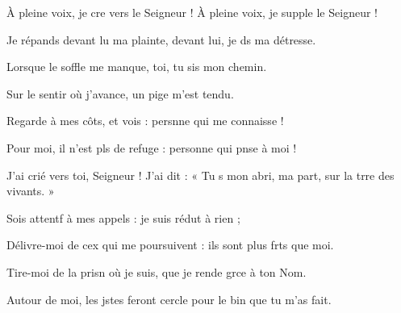 \item À pleine voix, je cre vers le Seigneur !\psstar{} À pleine voix, je supple le Seigneur !
\item Je répands devant lu ma plainte,\psstar{} devant lui, je ds ma détresse.
\item Lorsque le soffle me manque,\psstar{} toi, tu sis mon chemin.
\item Sur le sentir où j’avance,\psstar{} un pige m’est tendu.
\item Regarde à mes côts, et vois :\psstar{} persnne qui me connaisse !
\item Pour moi, il n’est pls de refuge :\psstar{} personne qui pnse à moi !
\item J’ai crié vers toi, Seigneur !\pscross{} J’ai dit : « Tu s mon abri,\psstar{} ma part, sur la trre des vivants. »
\item Sois attentf à mes appels :\psstar{} je suis rédut à rien ;
\item Délivre-moi de cex qui me poursuivent :\psstar{} ils sont plus frts que moi.
\item Tire-moi de la prisn où je suis,\psstar{} que je rende grce à ton Nom.
\item Autour de moi, les jstes feront cercle\psstar{} pour le bin que tu m’as fait.